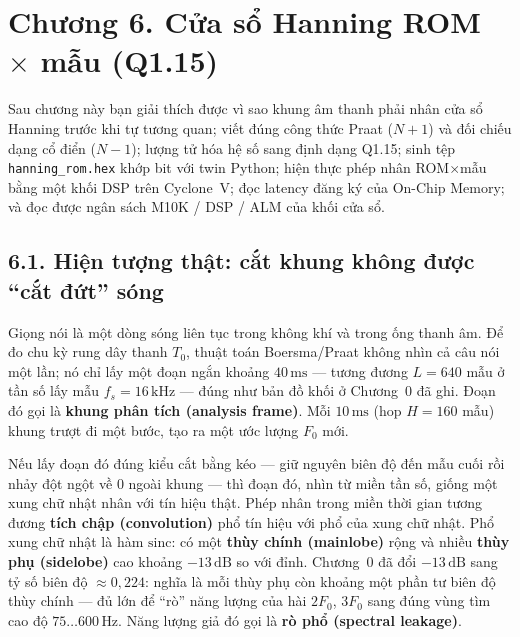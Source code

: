 \clearpage
{}
\section*{Chương 6. Cửa sổ Hanning ROM $\times$ mẫu (Q1.15)}

\begin{learningobj}
Sau chương này bạn giải thích được vì sao khung âm thanh phải nhân cửa sổ Hanning trước khi tự tương quan; viết đúng công thức Praat ($N{+}1$) và đối chiếu dạng cổ điển ($N{-}1$); lượng tử hóa hệ số sang định dạng Q1.15; sinh tệp \texttt{hanning\_rom.hex} khớp bit với twin Python; hiện thực phép nhân ROM$\times$mẫu bằng một khối DSP trên Cyclone~V; đọc latency đăng ký của On-Chip Memory; và đọc được ngân sách M10K / DSP / ALM của khối cửa sổ.
\end{learningobj}

\subsection*{6.1. Hiện tượng thật: cắt khung không được ``cắt đứt'' sóng}

Giọng nói là một dòng sóng liên tục trong không khí và trong ống thanh âm. Để đo chu kỳ rung dây thanh $T_0$, thuật toán Boersma/Praat không nhìn cả câu nói một lần; nó chỉ lấy một đoạn ngắn khoảng $40\,\text{ms}$ --- tương đương $L = 640$ mẫu ở tần số lấy mẫu $f_s = 16\,\text{kHz}$ --- đúng như bản đồ khối ở Chương~0 đã ghi. Đoạn đó gọi là \textbf{khung phân tích (analysis frame)}. Mỗi $10\,\text{ms}$ (hop $H = 160$ mẫu) khung trượt đi một bước, tạo ra một ước lượng $F_0$ mới.

Nếu lấy đoạn đó đúng kiểu cắt bằng kéo --- giữ nguyên biên độ đến mẫu cuối rồi nhảy đột ngột về 0 ngoài khung --- thì đoạn đó, nhìn từ miền tần số, giống một xung chữ nhật nhân với tín hiệu thật. Phép nhân trong miền thời gian tương đương \textbf{tích chập (convolution)} phổ tín hiệu với phổ của xung chữ nhật. Phổ xung chữ nhật là hàm $\mathrm{sinc}$: có một \textbf{thùy chính (mainlobe)} rộng và nhiều \textbf{thùy phụ (sidelobe)} cao khoảng $-13\,\text{dB}$ so với đỉnh. Chương~0 đã đổi $-13\,\text{dB}$ sang tỷ số biên độ $\approx 0{,}224$: nghĩa là mỗi thùy phụ còn khoảng một phần tư biên độ thùy chính --- đủ lớn để ``rò'' năng lượng của hài $2F_0$, $3F_0$ sang đúng vùng tìm cao độ $75\ldots 600\,\text{Hz}$. Năng lượng giả đó gọi là \textbf{rò phổ (spectral leakage)}.


